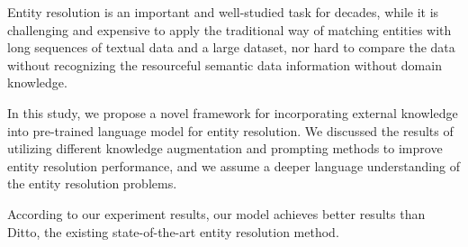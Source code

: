 
Entity resolution is an important and well-studied task for decades, while it is challenging and expensive to apply the traditional way of matching entities with long sequences of textual data and a large dataset, nor hard to compare the data without recognizing the resourceful semantic data information without domain knowledge. 

In this study, we propose a novel framework for incorporating external knowledge into pre-trained language model for entity resolution. We discussed the results of utilizing different knowledge augmentation and prompting methods to improve entity resolution performance, and we assume a deeper language understanding of the entity resolution problems. 

According to our experiment results, our model achieves better results than Ditto, the existing state-of-the-art entity resolution method. 

